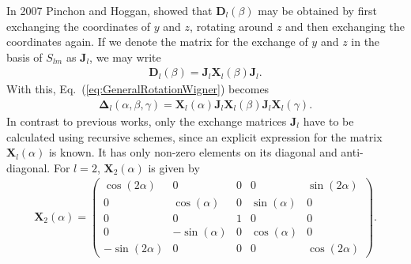 In 2007 Pinchon and Hoggan\cite{Pinchon2007}, showed that $\pmb{D}_l(\beta)$ may be obtained by first exchanging the
coordinates of $y$ and $z$, rotating around $z$ and then exchanging the coordinates again. If we denote the matrix
for the exchange of $y$ and $z$ in the basis of $S_{lm}$ as $\pmb{J}_l$, we may write
\begin{align}
  \pmb{D}_l(\beta) = \pmb{J}_l \pmb{X}_l(\beta) \pmb{J}_l.
\end{align}
With this, Eq.~(\ref{eq:GeneralRotationWigner}) becomes
\begin{align}
  \pmb{\Delta}_l(\alpha,\beta,\gamma) = \pmb{X}_l(\alpha) \pmb{J}_l \pmb{X}_l(\beta) \pmb{J}_l \pmb{X}_l(\gamma).
  \label{eq:SphericalHarmonicsRotation}
\end{align}
In contrast to previous works\cite{Ivanic1996,Blanco1997}, only the exchange matrices
$\pmb{J}_l$ have to be calculated using recursive schemes, since an explicit expression for the matrix
$\pmb{X}_l(\alpha)$ is known.
It has only non-zero elements on its diagonal and anti-diagonal. For $l=2$, $\pmb{X}_2(\alpha)$ is given by
\begin{align}
  \pmb{X}_2(\alpha) = \begin{pmatrix}
                      \cos(2\alpha) & 0            & 0 & 0            & \sin(2\alpha) \\
                      0             & \cos(\alpha) & 0 & \sin(\alpha) & 0 \\
                      0             & 0            & 1 & 0            & 0 \\
                      0             & -\sin(\alpha)& 0 & \cos(\alpha) & 0 \\
                      -\sin(2\alpha)& 0            & 0 & 0            & \cos(2\alpha)
                      \end{pmatrix}.
\end{align}

